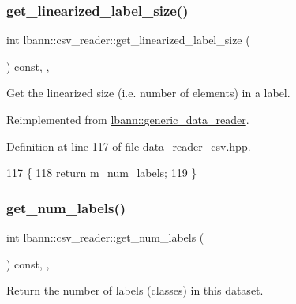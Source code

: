 \subsubsection{\texorpdfstring{get\+\_\+linearized\+\_\+label\+\_\+size()}{get\_linearized\_label\_size()}}
{\footnotesize\ttfamily int lbann\+::csv\+\_\+reader\+::get\+\_\+linearized\+\_\+label\+\_\+size (\begin{DoxyParamCaption}{ }\end{DoxyParamCaption}) const\hspace{0.3cm}{\ttfamily [inline]}, {\ttfamily [override]}, {\ttfamily [virtual]}}



Get the linearized size (i.\+e. number of elements) in a label. 



Reimplemented from \hyperlink{classlbann_1_1generic__data__reader_a99e8ba4f09fdc86d238ad7c8d2e2bce0}{lbann\+::generic\+\_\+data\+\_\+reader}.



Definition at line 117 of file data\+\_\+reader\+\_\+csv.\+hpp.


\begin{DoxyCode}
117                                                  \{
118     \textcolor{keywordflow}{return} \hyperlink{classlbann_1_1csv__reader_a8e377a058039b3d906738143356b93e4}{m\_num\_labels};
119   \}
\end{DoxyCode}
\mbox{\label{classlbann_1_1csv__reader_a435acd73d8ef4549fb398d006f26c01c}} 
\subsubsection{\texorpdfstring{get\+\_\+num\+\_\+labels()}{get\_num\_labels()}}
{\footnotesize\ttfamily int lbann\+::csv\+\_\+reader\+::get\+\_\+num\+\_\+labels (\begin{DoxyParamCaption}{ }\end{DoxyParamCaption}) const\hspace{0.3cm}{\ttfamily [inline]}, {\ttfamily [override]}, {\ttfamily [virtual]}}



Return the number of labels (classes) in this dataset. 



